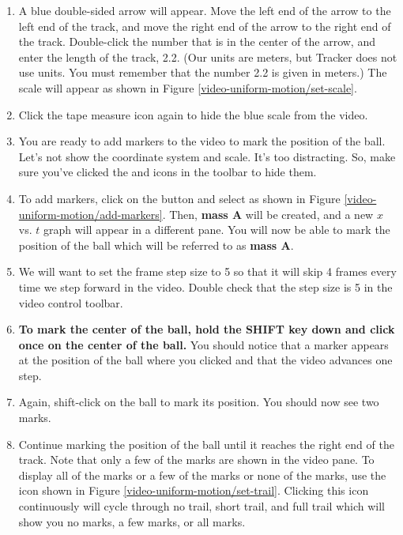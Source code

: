 \begin{enumerate}
	\item A blue double-sided arrow will appear. Move the left end of the arrow to the left end of the track, and move the right end of the arrow to the right end of the track. Double-click the number that is in the center of the arrow, and enter the length of the track, 2.2. (Our units are meters, but Tracker does not use units. You must remember that the number 2.2 is given in meters.) The scale will appear as shown in Figure \ref{video-uniform-motion/set-scale}.

	
	\item Click the tape measure icon again to hide the blue scale from the video.

	\item You are ready to add markers to the video to mark the position of the ball. Let's not show the coordinate system and scale. It's too distracting. So, make sure you've clicked the  and  icons in the toolbar to hide them.
		
	\item To add markers, click on the  button and select  as shown in Figure \ref{video-uniform-motion/add-markers}. Then, {\bf mass A} will be created, and a new $x$ vs. $t$ graph will appear in a different pane. You will now be able to mark the position of the ball which will be referred to as {\bf mass A}.

	
	\item We will want to set the frame step size to 5 so that it will skip 4 frames every time we step forward in the video. Double check that the step size is 5 in the video control toolbar.

	\item  {\bf To mark the center of the ball, hold the SHIFT key down and click once on the center of the ball.} You should notice that a marker appears at the position of the ball where you clicked and that the video advances one step.
	
	\item Again, shift-click on the ball to mark its position. You should now see two marks.
	
	\item Continue marking the position of the ball until it reaches the right end of the track. Note that only a few of the marks are shown in the video pane. To display all of the marks or a few of the marks or none of the marks, use the  icon shown in Figure \ref{video-uniform-motion/set-trail}. Clicking this icon continuously will cycle through no trail, short trail, and full trail which will show you no marks, a few marks, or all marks. 


\end{enumerate}
